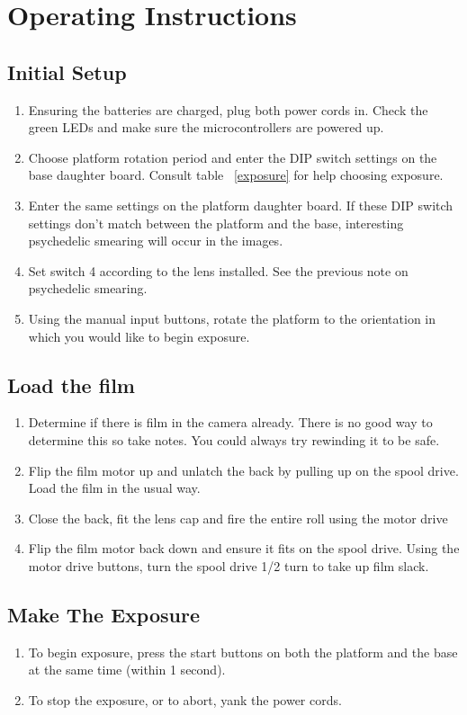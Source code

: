\documentclass[dvips,12pt]{article}
\begin{document}
\section{Operating Instructions}

\subsection{Initial Setup}
\begin{enumerate}
\item Ensuring the batteries are charged, plug both power cords in. Check the green LEDs and make sure the microcontrollers are powered up.
\item Choose platform rotation period and enter the DIP switch settings on the base daughter board. Consult table ~\ref{exposure} for help choosing exposure.
\item Enter the same settings on the platform daughter board. If these DIP switch settings don't match between the platform and the base, interesting psychedelic smearing will occur in the images.
\item Set switch 4 according to the lens installed. See the previous note on psychedelic smearing. 
\item Using the manual input buttons, rotate the platform to the orientation in which you would like to begin exposure. 
\end{enumerate}

\subsection{Load the film}
\begin{enumerate}
\item Determine if there is film in the camera already. There is no good way to determine this so take notes. You could always try rewinding it to be safe.
\item Flip the film motor up and unlatch the back by pulling up on the spool drive.
Load the film in the usual way.
\item Close the back, fit the lens cap and fire the entire roll using the motor drive
\item Flip the film motor back down and ensure it fits on the spool drive. Using the motor drive buttons, turn the spool drive 1/2 turn to take up film slack.
\end{enumerate}

\subsection{Make The Exposure}
\begin{enumerate}
\item To begin exposure, press the start buttons on both the platform and the base at the same time (within 1 second).
\item To stop the exposure, or to abort, yank the power cords.
\end{enumerate}
\end{document}
